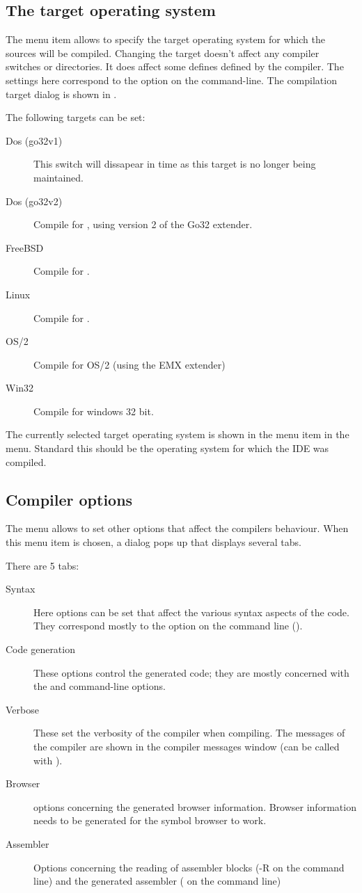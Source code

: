\subsection{The target operating system}
The menu item  allows to specify the target
operating system for which the sources will be compiled. 
Changing the target doesn't affect any compiler switches or 
directories. It does affect some defines defined by the compiler.
The settings here correspond to the option 
on the command-line. The compilation target dialog is shown in .


The following targets can be set:
\begin{description}
\item[Dos (go32v1)] This switch will dissapear in time as this target is no
longer being maintained.
\item[Dos (go32v2)] Compile for \dos, using version 2 of the Go32 extender.
\item[FreeBSD] Compile for \freebsd.
\item[Linux] Compile for \linux.
\item[OS/2] Compile for OS/2 (using the EMX extender)
\item[Win32] Compile for windows 32 bit.
\end{description}
The currently selected target operating system is shown in the menu item in
the  menu. Standard this should be the operating system for
which the IDE was compiled.
%
%
\subsection{Compiler options}
The menu  allows to set other options that affect the
compilers behaviour. When this menu item is chosen, a dialog pops up that
displays several tabs.

There are 5 tabs:
\begin{description}
\item[Syntax] Here options can be set that affect the various syntax aspects
of the code. They correspond mostly to the  option on the command
line ().
\item[Code generation] These options control the generated code; they are
mostly concerned with the  and  command-line options.
\item[Verbose] These set the verbosity of the compiler when compiling. The
messages of the compiler are shown in the compiler messages window (can be
called with ).
\item[Browser] options concerning the generated browser information. Browser
information needs to be generated for the symbol browser to work.
\item[Assembler] Options concerning the reading of assembler blocks (-R on
the command line) and the generated assembler ( on the command line)
\end{description}

